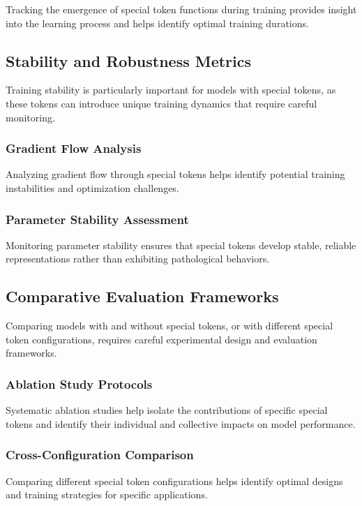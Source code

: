 Tracking the emergence of special token functions during training provides insight into the learning process and helps identify optimal training durations.

\subsection{Stability and Robustness Metrics}

Training stability is particularly important for models with special tokens, as these tokens can introduce unique training dynamics that require careful monitoring.

\subsubsection{Gradient Flow Analysis}

Analyzing gradient flow through special tokens helps identify potential training instabilities and optimization challenges.

\subsubsection{Parameter Stability Assessment}

Monitoring parameter stability ensures that special tokens develop stable, reliable representations rather than exhibiting pathological behaviors.

\subsection{Comparative Evaluation Frameworks}

Comparing models with and without special tokens, or with different special token configurations, requires careful experimental design and evaluation frameworks.

\subsubsection{Ablation Study Protocols}

Systematic ablation studies help isolate the contributions of specific special tokens and identify their individual and collective impacts on model performance.

\subsubsection{Cross-Configuration Comparison}

Comparing different special token configurations helps identify optimal designs and training strategies for specific applications.